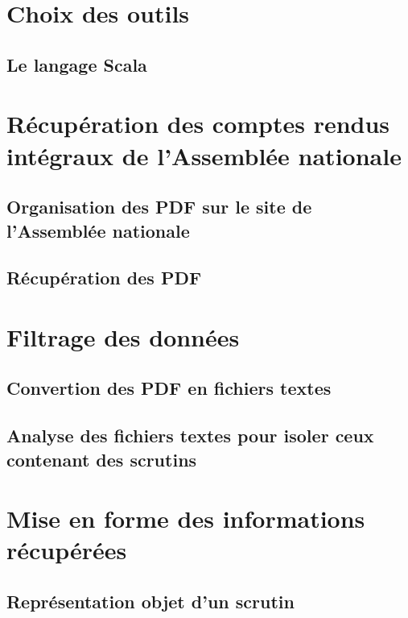 \section{Choix des outils}

\subsection{Le langage Scala}

\cleardoublepage

\section{Récupération des comptes rendus intégraux de l'Assemblée nationale}

\subsection{Organisation des PDF sur le site de l'Assemblée nationale}

\subsection{Récupération des PDF}

\cleardoublepage

\section{Filtrage des données}

\subsection{Convertion des PDF en fichiers textes}

\subsection{Analyse des fichiers textes pour isoler ceux contenant des scrutins}

\cleardoublepage

\section{Mise en forme des informations récupérées}

\subsection{Représentation objet d'un scrutin}

